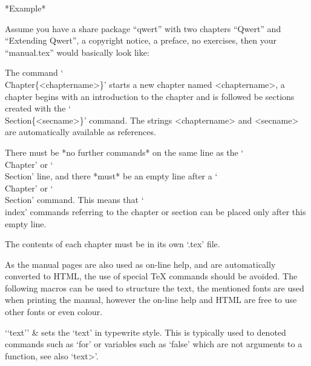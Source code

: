 *Example*

Assume you have a share package ``qwert'' with two chapters ``Qwert'' and
``Extending  Qwert'', a copyright  notice,  a preface, no exercises, then
your ``manual.tex'' would basically look like:

\begintt

  \FrontMatter
    \TableOfContents
  \Chapters
  \Appendices
    \Index
\EndOfBook
\endtt


The command `\\Chapter\{<chaptername>\}' starts a new chapter named
<chaptername>, a chapter begins with an introduction to the chapter and
is followed be sections created with the `\\Section\{<secname>\}'
command. The strings <chaptername> and <secname> are automatically
available as references.

There must be *no further commands* on the same line as the `\\Chapter'
or `\\Section' line,
and there *must* be an empty line after a `\\Chapter' or `\\Section'
command.
This means that `\\index' commands referring to the chapter or section
can be placed only after this empty line.

The contents of each chapter must be in its own `.tex' file.


As the manual pages are  also used as on-line help,
and are automatically converted to HTML,
the use of special {\TeX} commands should be avoided.
The following macros can  be used to  structure  the text, the  mentioned
fonts are used  when printing the manual,  however  the on-line help  and
HTML are free to use other fonts or even colour.

\beginitems

`{`text'}' &
    sets the `text' in typewrite style. This is typically used to denoted
    {\GAP} commands such as `for' or variables such as `false' which are
    not arguments to a function, see also `\<text>'.

